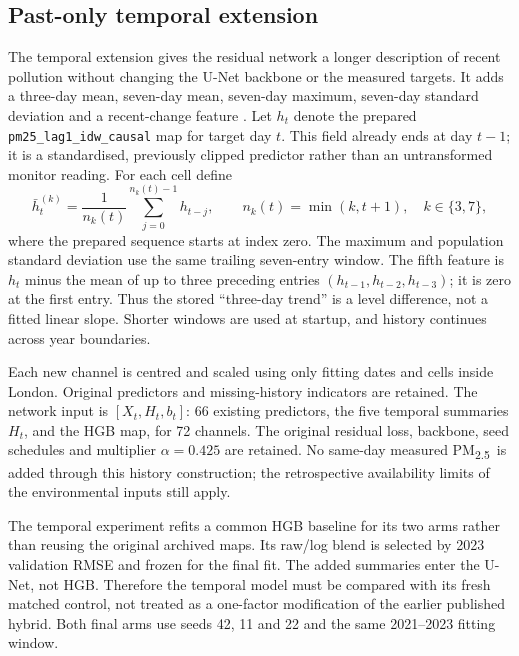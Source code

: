 \documentclass[11pt,a4paper]{article}
\newcommand{\pmfine}{PM\textsubscript{2.5}}
\begin{document}
\subsection{Past-only temporal extension}
\label{sec:temporal-method}
The temporal extension gives the residual network a longer description of
recent pollution without changing the U-Net backbone or the measured targets.
It adds a three-day mean, seven-day mean, seven-day maximum, seven-day standard
deviation and a recent-change feature \citep{aitkentemporal2026}. Let $h_t$
denote the prepared \texttt{pm25\_lag1\_idw\_causal} map for target day $t$.
This field already ends at day $t-1$; it is a standardised, previously clipped
predictor rather than an untransformed monitor reading. For each cell define
\begin{equation}
 \bar h^{(k)}_t=\frac{1}{n_k(t)}\sum_{j=0}^{n_k(t)-1}h_{t-j},
 \qquad n_k(t)=\min(k,t+1),\quad k\in\{3,7\},
\end{equation}
where the prepared sequence starts at index zero. The maximum and population
standard deviation use the same trailing seven-entry window. The fifth
feature is $h_t$ minus the mean of up to three preceding entries
$(h_{t-1},h_{t-2},h_{t-3})$; it is zero at the first entry. Thus the stored
``three-day trend'' is a level difference, not a fitted linear slope. Shorter
windows are used at startup, and history continues across year boundaries.

Each new channel is centred and scaled using only fitting dates and cells
inside London. Original predictors and missing-history indicators are retained.
The network input is $[X_t,H_t,b_t]$: 66 existing predictors, the five temporal
summaries $H_t$, and the HGB map, for 72 channels. The original residual loss,
backbone, seed schedules and multiplier $\alpha=0.425$ are retained. No
same-day measured \pmfine\ is added through this history construction; the
retrospective availability limits of the environmental inputs still apply.

The temporal experiment refits a common HGB baseline for its two arms rather
than reusing the original archived maps. Its raw/log blend is selected by
2023 validation RMSE and frozen for the final fit. The added summaries enter
the U-Net, not HGB. Therefore the temporal model must be compared with its
fresh matched control, not treated as a one-factor modification of the
earlier published hybrid. Both final arms use seeds 42, 11 and 22 and the
same 2021--2023 fitting window.
\end{document}
